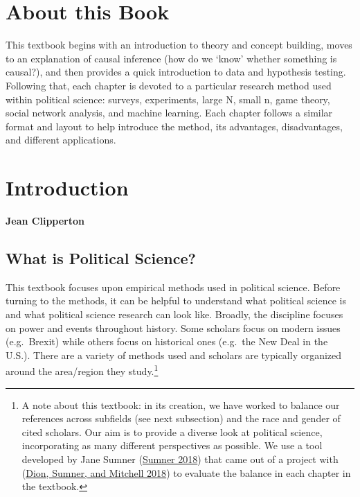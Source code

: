 \documentclass{book}
\begin{document}
\chapter*{About this Book}
This textbook begins with an introduction to theory and concept building,
moves to an explanation of causal inference (how do we `know' whether
something is causal?), and then provides a quick introduction to data and
hypothesis testing. Following that, each chapter is devoted to a particular
research method used within political science: surveys, experiments, large N,
small n, game theory, social network analysis, and machine learning. Each
chapter follows a similar format and layout to help introduce the method, its
advantages, disadvantages, and different applications.

\setcounter{tocdepth}{3}
\tableofcontents

\mainmatter

\hypertarget{introduction}{%
\chapter{Introduction}\label{introduction}}

\textbf{Jean Clipperton}

\hypertarget{what-is-political-science}{%
\section{What is Political Science?}\label{what-is-political-science}}

This textbook focuses upon empirical methods used in political science. Before
turning to the methods, it can be helpful to understand what political science
is and what political science research can look like. Broadly, the discipline
focuses on power and events throughout history. Some scholars focus on modern
issues (e.g.~Brexit) while others focus on historical ones (e.g.~the New Deal
in the U.S.). There are a variety of methods used and scholars are typically
organized around the area/region they study.\footnote{A note about this
  textbook: in its creation, we have worked to balance our references across
  subfields (see next subsection) and the race and gender of cited scholars.
  Our aim is to provide a diverse look at political science, incorporating as
  many different perspectives as possible. We use a tool developed by Jane
  Sumner (\protect\hyperlink{ref-sumner_2018}{Sumner 2018}) that came out of a
  project with (\protect\hyperlink{ref-dion_sumner_mitchell_2018}{Dion,
  Sumner, and Mitchell 2018}) to evaluate the balance in each chapter in the
  textbook.}
\end{document}
